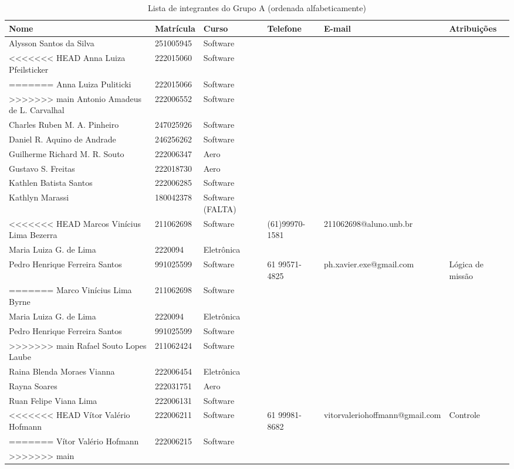 \begin{landscape}
\begin{table}[h!]
\centering
\begin{tabular}{|l|l|l|l|l|l|}
\hline
\textbf{Nome} & \textbf{Matrícula} & \textbf{Curso} & \textbf{Telefone} & \textbf{E-mail} & \textbf{Atribuições} \\ \hline
Alysson Santos da Silva & 251005945 & Software &  &  &  \\ \hline
<<<<<<< HEAD
Anna Luiza Pfeilsticker & 222015060 & Software &  &  &  \\ \hline
=======
Anna Luiza Puliticki & 222015066 & Software &  &  &  \\ \hline
>>>>>>> main
Antonio Amadeus de L. Carvalhal & 222006552 & Software &  &  &  \\ \hline
Charles Ruben M. A. Pinheiro & 247025926 & Software &  &  &  \\ \hline
Daniel R. Aquino de Andrade & 246256262 & Software &  &  &  \\ \hline
Guilherme Richard M. R. Souto & 222006347 & Aero &  &  &  \\ \hline
Gustavo S. Freitas & 222018730 & Aero &  &  &  \\ \hline
Kathlen Batista Santos & 222006285 & Software &  &  &  \\ \hline
Kathlyn Marassi & 180042378 & Software (FALTA) &  &  &  \\ \hline
<<<<<<< HEAD
Marcos Vinícius Lima Bezerra & 211062698 & Software & (61)99970-1581  & 211062698@aluno.unb.br  &  \\ \hline
Maria Luiza G. de Lima & 2220094 & Eletrônica &  &  &  \\ \hline
Pedro Henrique Ferreira Santos & 991025599 & Software & 61 99571-4825 & ph.xavier.exe@gmail.com &  Lógica de missão\\ \hline
=======
Marco Vinícius Lima Byrne & 211062698 & Software &  &  &  \\ \hline
Maria Luiza G. de Lima & 2220094 & Eletrônica &  &  &  \\ \hline
Pedro Henrique Ferreira Santos & 991025599 & Software &  &  &  \\ \hline
>>>>>>> main
Rafael Souto Lopes Laube & 211062424 & Software &  &  &  \\ \hline
Raina Blenda Moraes Vianna & 222006454 & Eletrônica &  &  &  \\ \hline
Rayna Soares & 222031751 & Aero &  &  &  \\ \hline
Ruan Felipe Viana Lima & 222006131 & Software &  &  &  \\ \hline
<<<<<<< HEAD
Vítor Valério Hofmann & 222006211 & Software & 61 99981-8682  & vitorvaleriohoffmann@gmail.com & Controle \\ \hline
=======
Vítor Valério Hofmann & 222006215 & Software &  &  &  \\ \hline
>>>>>>> main
\end{tabular}
\caption{Lista de integrantes do Grupo A (ordenada alfabeticamente)}
\end{table}



\end{landscape}